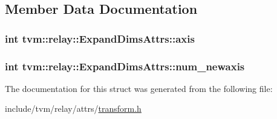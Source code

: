 \subsection{Member Data Documentation}
\subsubsection[{\texorpdfstring{axis}{axis}}]{\setlength{\rightskip}{0pt plus 5cm}int tvm\+::relay\+::\+Expand\+Dims\+Attrs\+::axis}\hypertarget{structtvm_1_1relay_1_1ExpandDimsAttrs_a289f19d5f47a1242a04a909c73ca34ac}{}\label{structtvm_1_1relay_1_1ExpandDimsAttrs_a289f19d5f47a1242a04a909c73ca34ac}
\subsubsection[{\texorpdfstring{num\+\_\+newaxis}{num_newaxis}}]{\setlength{\rightskip}{0pt plus 5cm}int tvm\+::relay\+::\+Expand\+Dims\+Attrs\+::num\+\_\+newaxis}\hypertarget{structtvm_1_1relay_1_1ExpandDimsAttrs_af2885538e2f74029ecad343a9844fc8a}{}\label{structtvm_1_1relay_1_1ExpandDimsAttrs_af2885538e2f74029ecad343a9844fc8a}


The documentation for this struct was generated from the following file\+:\begin{DoxyCompactItemize}
\item 
include/tvm/relay/attrs/\hyperlink{include_2tvm_2relay_2attrs_2transform_8h}{transform.\+h}\end{DoxyCompactItemize}
